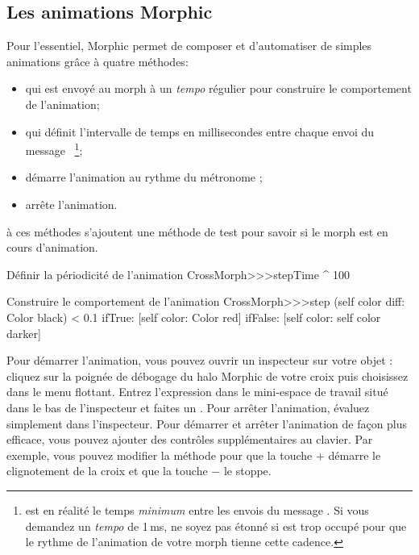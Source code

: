 \documentclass[a4paper,10pt,twoside]{book}
\begin{document}

\subsection{Les animations Morphic}

Pour l'essentiel, Morphic permet de composer et d'automatiser de
simples animations grâce à quatre méthodes:
\begin{itemize}
\item {} qui est envoyé au morph à un
  \emph{tempo} régulier pour construire le comportement de l'animation;
\item {} qui définit l'intervalle de temps en
  millisecondes entre chaque envoi du message ~\footnote{ est
    en réalité le temps \emph{minimum} entre les envois du message
    . Si vous demandez un \emph{tempo}  de
    1\,ms, ne soyez pas étonné si \pharo est trop occupé pour que
    le rythme de l'animation de votre morph tienne cette cadence.};
\item {} démarre l'animation au rythme
  du métronome ;
\item {} arrête l'animation.
\end{itemize}

à ces méthodes s'ajoutent une méthode de test
 pour savoir si le morph est en cours
d'animation.%

\begin{method}{Définir la périodicité de l'animation}
CrossMorph>>>stepTime
	^ 100
\end{method}
\begin{method}{Construire le comportement de l'animation}
CrossMorph>>>step
	(self color diff: Color black) < 0.1
		ifTrue: [self color: Color red]
		ifFalse: [self color: self color darker]
\end{method}
\noindent
Pour démarrer l'animation, vous pouvez ouvrir un inspecteur sur
votre objet : cliquez sur la poignée de débogage 
\debugHandle{} du halo Morphic de votre croix 
 puis choisissez  dans le
menu flottant. Entrez l'expression  dans le
mini-espace de travail situé dans le bas de l'inspecteur et faites
un .
Pour arrêter l'animation, évaluez simplement  dans l'inspecteur. 
Pour démarrer et arrêter l'animation de façon plus efficace, vous pouvez
ajouter des contrôles supplémentaires au clavier. Par exemple,
vous pouvez modifier la méthode  pour que la
touche $+$ démarre le clignotement de la croix et que la touche $-$
le stoppe.
\end{document}
